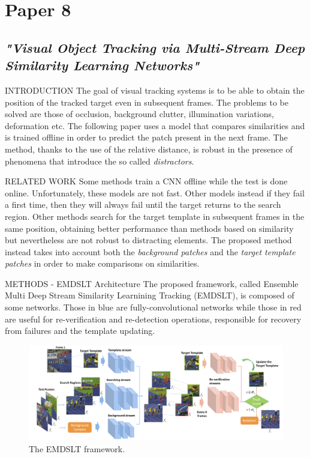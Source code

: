 \section{Paper 8}
\subsection{\emph{"Visual Object Tracking via Multi-Stream Deep Similarity Learning Networks"}}

\begin{frame}{INTRODUCTION}
    The goal of visual tracking systems is to be able to obtain the position of 
    the tracked target even in subsequent frames. The problems to be solved 
    are those of occlusion, background clutter, illumination variations, 
    deformation etc. The following paper uses a model that compares 
    similarities and is trained offline in order to predict the patch present in 
    the next frame. The method, thanks to the use of the relative distance, 
    is robust in the presence of phenomena that introduce the so called 
    \emph{distractors}.
\end{frame}

\begin{frame}{RELATED WORK}
    Some methods train a CNN offline while the test is done online. Unfortunately, 
    these models are not fast. Other models instead if they fail a first 
    time, then they will always fail until the target returns to the search region. 
    Other methods   search for the target template in subsequent frames 
    in the same position, obtaining better performance than methods based on 
    similarity but nevertheless are not robust to distracting elements. The proposed 
    method instead takes into account both the \emph{background patches} and 
    the \emph{target template patches} in order to make comparisons on similarities.
\end{frame}

\begin{frame}{METHODS - EMDSLT Architecture}
    The proposed framework, called Ensemble Multi Deep Stream Similarity 
    Learnining Tracking (EMDSLT), is composed of some networks. Those 
    in blue are fully-convolutional networks while those in red are useful for 
    re-verification and re-detection operations, responsible for recovery from 
    failures and the template updating.
    \begin{figure}[h!]
        \centering
        \includegraphics[width = \linewidth]{images/paper8/EMDSLT.png}
        \centering
        \caption{The EMDSLT framework.}
        \label{fig:EMDSLT}
    \end{figure}
\end{frame}

